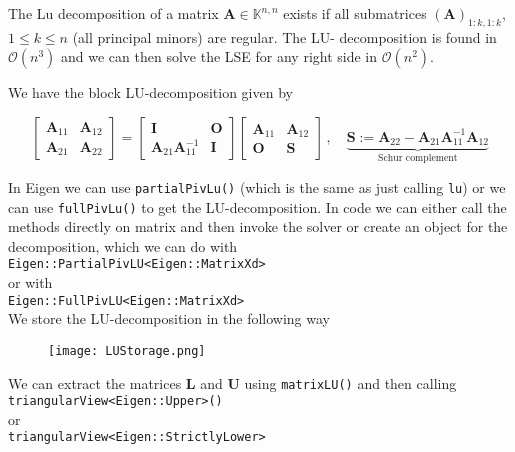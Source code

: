 \documentclass{article}
\begin{document}
\noindent The Lu decomposition of a matrix $\mathbf{A} \in \mathbb{K}^{n,n}$ exists if all submatrices $\left(\mathbf{A}\right)_{1:k,1:k}$, $1 \leq k \leq n$ (all principal minors) are regular. The LU- decomposition is found in $\mathcal{O}\left(n^{3}\right)$ and we can then solve the LSE for any right side in $\mathcal{O}\left(n^{2}\right)$. 

\pagebreak

\noindent We have the block LU-decomposition given by

\begin{equation*}
    \begin{bmatrix}
    \mathbf{A}_{11} & \mathbf{A}_{12} \\
    \mathbf{A}_{21} & \mathbf{A}_{22}
    \end{bmatrix} = \begin{bmatrix}
        \mathbf{I} & \mathbf{O} \\
        \mathbf{A}_{21}\mathbf{A}_{11}^{-1} & \mathbf{I}
    \end{bmatrix}
    \begin{bmatrix}
        \mathbf{A}_{11} & \mathbf{A}_{12} \\
        \mathbf{O} & \mathbf{S}
    \end{bmatrix}\,,\quad \underbrace{\mathbf{S} := \mathbf{A}_{22}- \mathbf{A}_{21}\mathbf{A}_{11}^{-1}\mathbf{A}_{12}}_{\text{Schur complement}}
\end{equation*}

\noindent In Eigen we can use \verb|partialPivLu()| (which is the same as just calling \verb|lu|) or we can use \verb|fullPivLu()| to get the LU-decomposition. In code we can either call the methods directly on matrix and then invoke the solver or create an object for the decomposition, which we can do with \\[2mm] \verb|Eigen::PartialPivLU<Eigen::MatrixXd>| \\[1mm] or with 
\\[2mm]
\verb|Eigen::FullPivLU<Eigen::MatrixXd>| \\[1mm] We store the LU-decomposition in the following way
\begin{figure}[!hbt]
    \centering
\texttt{[image: LUStorage.png]}
\end{figure}
We can extract the matrices $\mathbf{L}$ and $\mathbf{U}$ using \verb|matrixLU()| and then calling 
\\[2mm]
\verb|triangularView<Eigen::Upper>()| 
\\[1mm]
or  \\[2mm]
\verb|triangularView<Eigen::StrictlyLower>| \\[1mm]
\end{document}
